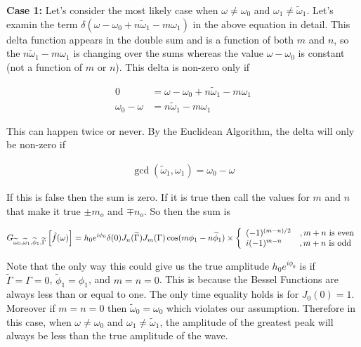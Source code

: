 \documentclass[onecolumn, groupedaddress, 10pt]{revtex4-1}
\begin{document}
\textbf{Case 1:}  Let's consider the most likely case when $\omega \neq \omega_0$ and $\omega_1 \neq \widetilde{\omega}_1$.  Let's examin the term $\delta(\omega - \omega_0 + n\widetilde{\omega}_1 - m\omega_1)$ in the above equation in detail.  This delta function appears in the double sum and is a function of both $m$ and $n$, so the $n\widetilde{\omega}_1 - m\omega_1$ is changing over the sums whereas the value $\omega - \omega_0$ is constant (not a function of $m$ or $n$).  This delta is non-zero only if

\begin{align}
                0 &= \omega - \omega_0 + n\widetilde{\omega}_1 - m\omega_1		\\
\omega_0 - \omega &= n\widetilde{\omega}_1 - m\omega_1
\end{align}

This can happen twice or never.  By the Euclidean Algorithm, the delta will only be non-zero if

\begin{align}
\gcd \left( \widetilde{\omega}_1, \omega_1 \right) = \omega_0 - \omega
\end{align}

If this is false then the sum is zero.  If it is true then call the values for $m$ and $n$ that make it true $\pm m_o$ and $\mp n_o$.  So then the sum is 

\begin{align}
G_{\widetilde{\omega}_0,\widetilde{\omega}_1,\widetilde{\phi}_1,\widetilde{\Gamma}} \left[ \hat{f}(\omega) \right] = 
h_0 e^{i\phi_0} \delta (0) J_n(\widetilde{\Gamma})J_m(\Gamma) \cos (m\phi_1-n\widetilde{\phi}_1) \times
\left\{
     \begin{array}{lr}
        (-1)^{(m-n)/2} & , m+n $ is even$    \\
		i (-1)^{m-n}   & , m+n $ is odd $
     \end{array}
   \right.
\end{align}

Note that the only way this could give us the true amplitude $h_0 e^{i\phi_0}$ is if $\widetilde{\Gamma} = \Gamma = 0$, $\widetilde{\phi}_1 = \phi_1$, and $m=n=0$.  This is because the Bessel Functions are always less than or equal to one.  The only time equality holds is for $J_0(0)=1$.  Moreover if $m=n=0$ then $\widetilde{\omega}_0 = \omega_0$ which violates our assumption.  Therefore in this case, when $\omega \neq \omega_0$ and $\omega_1 \neq \widetilde{\omega}_1$, the amplitude of the greatest peak will always be less than the true amplitude of the wave.
\end{document}
